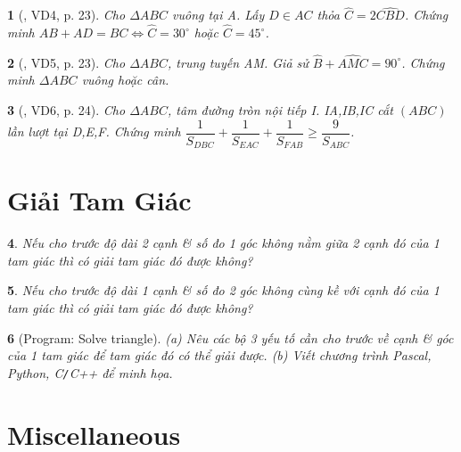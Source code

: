 \documentclass{article}
\newtheorem{baitoan}{}
\begin{document}
\begin{baitoan}[\cite{Hai_Hung_Thu_Tung2022_tap_1}, VD4, p. 23]
	Cho $\Delta ABC$ vuông tại A. Lấy $D\in AC$ thỏa $\widehat{C} = 2\widehat{CBD}$. Chứng minh $AB + AD = BC\Leftrightarrow\widehat{C} = 30^\circ$ hoặc $\widehat{C} = 45^\circ$.
\end{baitoan}

\begin{baitoan}[\cite{Hai_Hung_Thu_Tung2022_tap_1}, VD5, p. 23]
	Cho $\Delta ABC$, trung tuyến AM. Giả sử $\widehat{B} + \widehat{AMC} = 90^\circ$. Chứng minh $\Delta ABC$ vuông hoặc cân.
\end{baitoan}

\begin{baitoan}[\cite{Hai_Hung_Thu_Tung2022_tap_1}, VD6, p. 24]
	Cho $\Delta ABC$, tâm đường tròn nội tiếp I. IA,IB,IC cắt $(ABC)$ lần lượt tại D,E,F. Chứng minh $\dfrac{1}{S_{DBC}} + \dfrac{1}{S_{EAC}} + \dfrac{1}{S_{FAB}}\ge\dfrac{9}{S_{ABC}}$.
\end{baitoan}


\section{Giải Tam Giác}

\begin{baitoan}
	Nếu cho trước độ dài 2 cạnh \& số đo 1 góc không nằm giữa 2 cạnh đó của 1 tam giác thì có giải tam giác đó được không?
\end{baitoan}

\begin{baitoan}
	Nếu cho trước độ dài 1 cạnh \& số đo 2 góc không cùng kề với cạnh đó của 1 tam giác thì có giải tam giác đó được không?
\end{baitoan}

\begin{baitoan}[{\sf Program: Solve triangle}]
	(a) Nêu các bộ 3 yếu tố cần cho trước về cạnh \& góc của 1 tam giác để tam giác đó có thể giải được. (b) Viết chương trình {\sf Pascal, Python, C{\tt/}C++} để minh họa.
\end{baitoan}


\section{Miscellaneous}


\printbibliography[heading=bibintoc]
	
\end{document}
